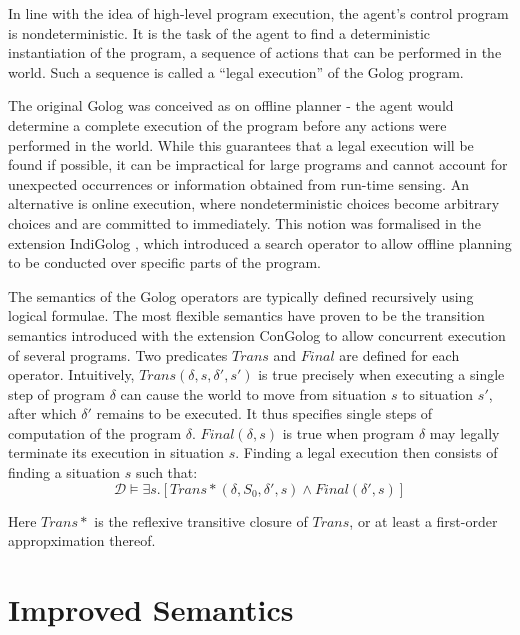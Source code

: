 \documentclass[letterpaper]{article}
\begin{document}
In line with the idea of high-level program execution, the agent's
control program is nondeterministic. It is the task of the agent to
find a deterministic instantiation of the program, a sequence of actions
that can be performed in the world. Such a sequence is called a ``legal
execution'' of the Golog program.

The original Golog was conceived as on offline planner - the agent
would determine a complete execution of the program before any actions
were performed in the world. While this guarantees that a legal execution
will be found if possible, it can be impractical for large programs
and cannot account for unexpected occurrences or information obtained
from run-time sensing. An alternative is online execution, where nondeterministic
choices become arbitrary choices and are committed to immediately.
This notion was formalised in the extension IndiGolog \cite{giacomo99indigolog},
which introduced a search operator to allow offline planning to be
conducted over specific parts of the program.

The semantics of the Golog operators are typically defined recursively
using logical formulae. The most flexible semantics have proven to
be the transition semantics introduced with the extension ConGolog
\cite{giacomo00congolog} to allow concurrent execution of several
programs. Two predicates $Trans$ and $Final$ are defined for each
operator. Intuitively, $Trans(\delta,s,\delta',s')$ is true precisely
when executing a single step of program $\delta$ can cause the world
to move from situation $s$ to situation $s'$, after which $\delta'$
remains to be executed. It thus specifies single steps of computation
of the program $\delta$. $Final(\delta,s)$ is true when program
$\delta$ may legally terminate its execution in situation $s$. Finding
a legal execution then consists of finding a situation $s$ such that:
\begin{equation}
\mathcal{D}\models\exists s.\left[Trans*(\delta,S_{0},\delta',s)\wedge Final(\delta',s)\right]
\end{equation}

Here $Trans*$ is the reflexive transitive closure of $Trans$, or at least a
first-order appropximation thereof.

\section{Improved Semantics}

\label{sec:MIndiGolog}
\end{document}
